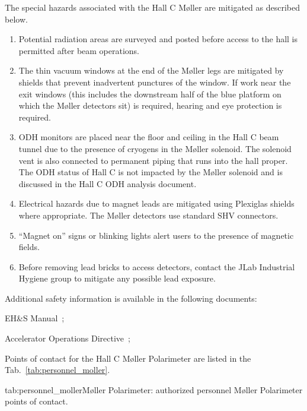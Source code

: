 \begin{safetyen}{0}{0}
The special hazards associated with the Hall C M\o ller are mitigated as
described below.

\begin{enumerate}
        \item{Potential radiation areas are surveyed and posted before access to the hall is permitted
        after beam operations.}
        \item{The thin vacuum windows at the end of the M\o ller legs are mitigated by shields that prevent inadvertent
        punctures of the window. If work near the exit windows (this includes the downstream half of the blue platform
        on which the M\o ller detectors sit) is required, hearing and eye protection is required.}
        \item{ODH monitors are placed near the floor and ceiling in the Hall C beam tunnel due to the presence of cryogens
        in the M\o ller solenoid. The solenoid vent is also connected to permanent piping that runs into the hall proper.
        The ODH status of Hall C is not impacted by the M\o ller solenoid and is discussed in the Hall C ODH
        analysis document.}
        \item{Electrical hazards due to magnet leads are mitigated using Plexiglas shields where appropriate.
        The M\o ller detectors use standard SHV connectors.}
        \item{``Magnet on'' signs or blinking lights alert users to the presence of magnetic fields.}
        \item{Before removing lead bricks to access detectors, contact the JLab Industrial Hygiene group to mitigate any possible
        lead exposure.}
\end{enumerate}

\noindent{}Additional safety information is available in the following documents:
\begin{list}{--}{\setlength{\itemsep}{-0.15cm}}
  \item EH\&S Manual~\cite{EHScebaf};
  \item Accelerator Operations Directive~\cite{AODcebaf};
\end{list}


Points of contact for the Hall C M\o ller Polarimeter are listed in the Tab.~\ref{tab:personnel_moller}.

\begin{namestab}{tab:personnel_moller}{M\o ller Polarimeter: authorized personnel}{%
   M\o ller Polarimeter points of contact.}
\end{namestab}
\end{safetyen}
